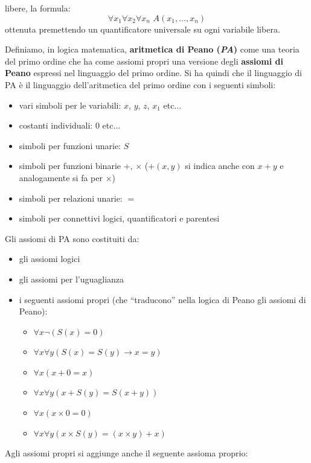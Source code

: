 \documentclass[a4paper,12pt, oneside]{book}
\begin{document}
\begin{shaded}
\begin{definizione}
    libere, la formula:
    \[\forall x_1\forall x_2\forall x_n\,\,A(x_1,\ldots,x_n)\]
    ottenuta premettendo un quantificatore universale su ogni variabile libera. 
  \end{definizione}
  \begin{definizione}
    Definiamo, in logica matematica, \textbf{aritmetica di Peano (\textit{PA})}
    come una teoria del primo 
    ordine che ha come assiomi propri una versione degli \textbf{assiomi di
      Peano} 
    espressi nel linguaggio del primo ordine. Si ha quindi che il linguaggio di
    PA 
    è il linguaggio dell'aritmetica del primo ordine con i seguenti simboli:
    \begin{itemize}
      \item vari simboli per le variabili: $x$, $y$, $z$, $x_1$ etc$\ldots$
      \item costanti individuali: $0$ etc$\ldots$
      \item simboli per funzioni unarie: $S$
      \item simboli per funzioni binarie $+$, $\times$ ($+(x,y)$ si indica anche
      con $x+y$ e analogamente si fa per $\times$)
      \item simboli per relazioni unarie: $=$
      \item simboli per connettivi logici, quantificatori e parentesi
    \end{itemize}
    Gli assiomi di PA sono costituiti da:
    \begin{itemize}
      \item gli assiomi logici
      \item gli assiomi per l'uguaglianza
      \item i seguenti assiomi propri (che ``traducono'' nella logica di Peano
      gli assiomi di Peano):
      \begin{itemize}
        \item $\forall x\neg(S(x)=0)$
        \item $\forall x\forall y(S(x)=S(y)\to x=y)$
        \item $\forall x(x+0=x)$
        \item $\forall x\forall y(x+S(y)=S(x+y))$
        \item $\forall x(x\times 0 =0)$
        \item $\forall x\forall y(x\times S(y)=(x\times y)+x)$
      \end{itemize}
    \end{itemize}
    Agli assiomi propri si aggiunge anche il seguente assioma proprio:

\end{definizione}
\end{shaded}
\end{document}
